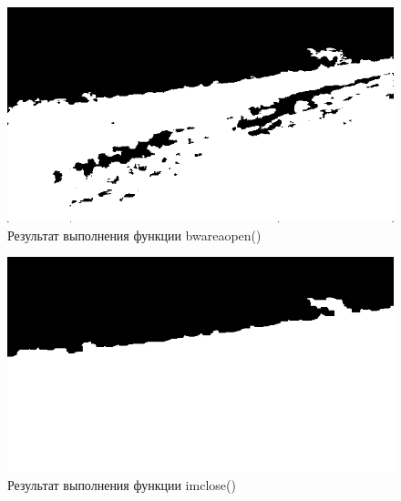 \begin{figure}[h!]
\centering 
\includegraphics[width=\textwidth]{../outputs/image_bwareoopen_segmentation.png}
\caption{Результат выполнения функции bwareaopen()}
\label{fig:р}
\end{figure}

\pagebreak

\begin{figure}[h!]
    \includegraphics[width=\textwidth]{../outputs/image_imclose_segmentation.png}
    \caption{Результат выполнения функции imclose()}
    \label{fig:р}
\end{figure}

